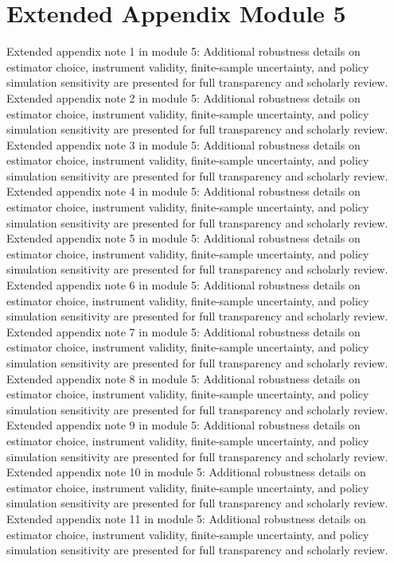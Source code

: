 \documentclass[preprint,12pt]{elsarticle}
\begin{document}
\section{Extended Appendix Module 5}
Extended appendix note 1 in module 5: Additional robustness details on estimator choice, instrument validity, finite-sample uncertainty, and policy simulation sensitivity are presented for full transparency and scholarly review.
Extended appendix note 2 in module 5: Additional robustness details on estimator choice, instrument validity, finite-sample uncertainty, and policy simulation sensitivity are presented for full transparency and scholarly review.
Extended appendix note 3 in module 5: Additional robustness details on estimator choice, instrument validity, finite-sample uncertainty, and policy simulation sensitivity are presented for full transparency and scholarly review.
Extended appendix note 4 in module 5: Additional robustness details on estimator choice, instrument validity, finite-sample uncertainty, and policy simulation sensitivity are presented for full transparency and scholarly review.
Extended appendix note 5 in module 5: Additional robustness details on estimator choice, instrument validity, finite-sample uncertainty, and policy simulation sensitivity are presented for full transparency and scholarly review.
Extended appendix note 6 in module 5: Additional robustness details on estimator choice, instrument validity, finite-sample uncertainty, and policy simulation sensitivity are presented for full transparency and scholarly review.
Extended appendix note 7 in module 5: Additional robustness details on estimator choice, instrument validity, finite-sample uncertainty, and policy simulation sensitivity are presented for full transparency and scholarly review.
Extended appendix note 8 in module 5: Additional robustness details on estimator choice, instrument validity, finite-sample uncertainty, and policy simulation sensitivity are presented for full transparency and scholarly review.
Extended appendix note 9 in module 5: Additional robustness details on estimator choice, instrument validity, finite-sample uncertainty, and policy simulation sensitivity are presented for full transparency and scholarly review.
Extended appendix note 10 in module 5: Additional robustness details on estimator choice, instrument validity, finite-sample uncertainty, and policy simulation sensitivity are presented for full transparency and scholarly review.
Extended appendix note 11 in module 5: Additional robustness details on estimator choice, instrument validity, finite-sample uncertainty, and policy simulation sensitivity are presented for full transparency and scholarly review.
\end{document}
